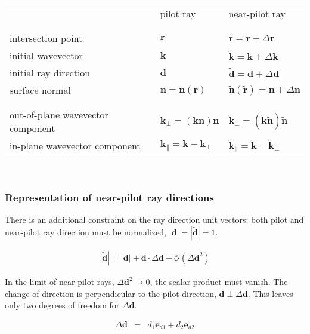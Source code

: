 \documentclass[12pt,a4paper,twoside,openright,BCOR10mm,headsepline,titlepage,abstracton,chapterprefix,final]{scrreprt}
\newcommand\Vector[1]{{\mathbf{#1}}}
\newcommand\wavenumber{k}
\newcommand\Wavevector{\Vector{\wavenumber}}
\begin{document}
\begin{tabular}{ l | l | l }
		    & pilot ray & near-pilot ray \\
& & \\ \hline & & \\
intersection point  & $\Vector{r}$ & $\tilde{\Vector{r}} = \Vector{r} + \Delta\Vector{r}$ \\
initial wavevector  & $\Wavevector$ & $\tilde{\Wavevector} = \Wavevector + \Delta\Wavevector$ \\
initial ray direction  & $\Vector{d}$ & $\tilde{\Vector{d}} = \Vector{d} + \Delta\Vector{d}$ \\
surface normal      & $\Vector{n} = \Vector{n}(\Vector{r})$ & $\tilde{\Vector{n}}(\tilde{\Vector{r}}) = \Vector{n} + \Delta\Vector{n}$ \\
& & \\ \hline & & \\
out-of-plane wavevector component &  $\Wavevector_{\perp} = (\Wavevector \Vector{n})\Vector{n}$ & $\tilde{\Wavevector}_{\perp} = (\tilde{\Wavevector} \tilde{\Vector{n}})\tilde{\Vector{n}}$ \\
in-plane wavevector component     &  $\Wavevector_{\parallel} = \Wavevector - \Wavevector_{\perp}$ & $\tilde{\Wavevector}_{\parallel} = \tilde{\Wavevector} - \tilde{\Wavevector}_{\perp}$ \\
\end{tabular}
\\[2ex]

\subsubsection{Representation of near-pilot ray directions}

There is an additional constraint on the ray direction unit vectors: both pilot and near-pilot ray direction must be normalized,
$|\Vector{d}|=|\tilde{\Vector{d}}|=1$.

\begin{eqnarray}
 |\tilde{\Vector{d}}| = |\Vector{d}| + \Vector{d} \cdot \Delta\Vector{d} + \mathcal{O}(\Delta\Vector{d}^2)
\end{eqnarray}

In the limit of near pilot rays, $\Delta\Vector{d}^2 \rightarrow 0$, the scalar product must vanish. 
The change of direction is perpendicular to the pilot direction, $\Vector{d} \perp \Delta\Vector{d}$. 
This leaves only two degrees of freedom for $\Delta\Vector{d}$.

\begin{eqnarray}
 \Delta\Vector{d} &=& d_1 \Vector{e}_{d1} + d_2 \Vector{e}_{d2}
\end{eqnarray}
\end{document}
